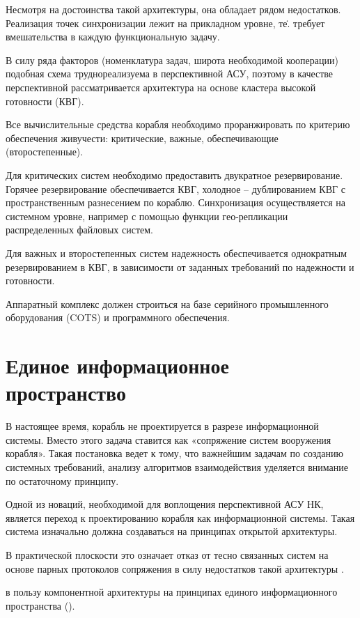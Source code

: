 \documentclass[paper=a4, fontsize=12pt, titlepage=false, twoside=false]{scrartcl}
\begin{document}
Несмотря на достоинства такой архитектуры, она обладает рядом недостатков.
Реализация точек синхронизации лежит на прикладном уровне, т\.е.
требует вмешательства в каждую функциональную задачу.

В силу ряда факторов (номенклатура задач, широта необходимой кооперации)
подобная схема труднореализуема в перспективной АСУ, поэтому
в качестве перспективной рассматривается архитектура на основе
кластера высокой готовности (КВГ).

Все вычислительные средства корабля необходимо проранжировать по
критерию обеспечения живучести: критические, важные, обеспечивающие
(второстепенные).

Для критических систем необходимо предоставить двукратное резервирование.
Горячее резервирование обеспечивается КВГ, холодное -- дублированием
КВГ с пространственным разнесением по кораблю. Синхронизация осуществляется
на системном уровне, например с помощью функции гео-репликации
распределенных файловых систем.

Для важных и второстепенных систем надежность обеспечивается однократным
резервированием в КВГ, в зависимости от заданных требований по надежности
и готовности.

Аппаратный комплекс должен строиться на базе серийного
промышленного оборудования (COTS) и программного обеспечения.

\section{Единое информационное пространство}

В настоящее время, корабль не проектируется в разрезе
информационной системы. Вместо этого задача ставится как
«сопряжение систем вооружения корабля». Такая
постановка ведет к тому, что важнейшим задачам по созданию системных
требований, анализу алгоритмов взаимодействия уделяется внимание по
остаточному принципу.

Одной из новаций, необходимой для воплощения перспективной АСУ НК,
является переход к проектированию корабля как информационной
системы. Такая система изначально должна создаваться
на принципах открытой архитектуры. 

В практической плоскости это означает отказ
от тесно связанных систем на основе парных протоколов сопряжения
в силу недостатков такой архитектуры \cite{p2p}.

в пользу компонентной архитектуры
на принципах единого информационного пространства \cite{distrib,dds} ().
\end{document}
